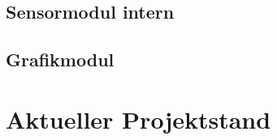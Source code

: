 \documentclass[a4paper,11pt]{article}
\begin{document}
\subsection{Sensormodul intern}
\label{subsub:sensorModul_int}

\subsection{Grafikmodul}
\label{subsub:grafikmodul}

\section{Aktueller Projektstand}
\end{document}

